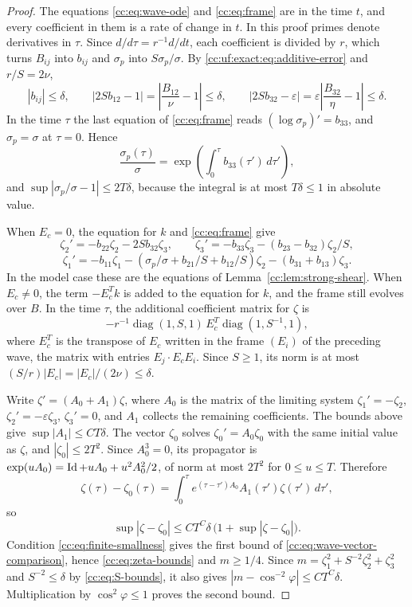 \begin{proof}
The equations \eqref{cc:eq:wave-ode} and \eqref{cc:eq:frame} are in the
time $t$, and every coefficient in them is a rate of change in $t$.
In this proof primes denote derivatives in $\tau$. Since
$d/d\tau=r^{-1}d/dt$, each coefficient is divided by $r$,
which turns $B_{ij}$ into $b_{ij}$ and $\sigma_p$ into
$S\sigma_p/\sigma$. By \eqref{cc:uf:exact:eq:additive-error} and
$r/S=2\nu$,
\[
 |b_{ij}|\le\delta,\qquad
 |2Sb_{12}-1|=\left|\frac{B_{12}}{\nu}-1\right|\le\delta,\qquad
 |2Sb_{32}-\varepsilon|
 =\varepsilon\left|\frac{B_{32}}{\eta}-1\right|\le\delta .
\]
In the time $\tau$ the last equation of \eqref{cc:eq:frame} reads
$(\log\sigma_p)'=b_{33}$, and $\sigma_p=\sigma$ at $\tau=0$. Hence
\[
 \frac{\sigma_p(\tau)}{\sigma}
 =\exp\left(\int_0^\tau b_{33}(\tau')\,d\tau'\right),
\]
and $\sup|\sigma_p/\sigma-1|\le2T\delta$, because the integral is at
most $T\delta\le1$ in absolute value.

When $E_c=0$, the equation for $k$ and
\eqref{cc:eq:frame} give
\[
 \zeta_2'=-b_{22}\zeta_2-2Sb_{32}\zeta_3,\qquad
 \zeta_3'=-b_{33}\zeta_3-(b_{23}-b_{32})\zeta_2/S,
\]
\[
 \zeta_1'=-b_{11}\zeta_1
  -(\sigma_p/\sigma+b_{21}/S+b_{12}/S)\zeta_2
  -(b_{31}+b_{13})\zeta_3.
\]
In the model case these are the equations of
Lemma~\ref{cc:lem:strong-shear}. When $E_c\ne0$, the term $-E_c^Tk$ is added to the equation for $k$,
and the frame still evolves over $B$. In the time $\tau$, the
additional coefficient matrix for $\zeta$ is
\[
 -r^{-1}\operatorname{diag}(1,S,1)\,E_c^T
                      \operatorname{diag}(1,S^{-1},1),
\]
where $E_c^T$ is the transpose of $E_c$ written in the frame $(E_i)$
of the preceding wave, the matrix with entries $E_j\cdot E_cE_i$.
Since $S\ge1$, its norm is at
most $(S/r)|E_c|=|E_c|/(2\nu)\le\delta$.

Write $\zeta'=(A_0+A_1)\zeta$, where $A_0$ is the matrix of the
limiting system $\zeta_1'=-\zeta_2$, $\zeta_2'=-\varepsilon\zeta_3$,
$\zeta_3'=0$, and $A_1$ collects the remaining coefficients. The bounds
above give $\sup|A_1|\le CT\delta$. The vector $\zeta_0$ solves
$\zeta_0'=A_0\zeta_0$ with the same initial value as $\zeta$, and
$|\zeta_0|\le2T^2$. Since $A_0^3=0$, its propagator is
$\exp(uA_0)=\operatorname{Id}+uA_0+u^2A_0^2/2$, of norm at most $2T^2$ for
$0\le u\le T$. Therefore
\[
 \zeta(\tau)-\zeta_0(\tau)
 =\int_0^\tau e^{(\tau-\tau')A_0}A_1(\tau')\zeta(\tau')\,d\tau',
\]
so
\[
 \sup|\zeta-\zeta_0|
 \le CT^C\delta\,\bigl(1+\sup|\zeta-\zeta_0|\bigr).
\]
Condition \eqref{cc:eq:finite-smallness} gives the first bound of
\eqref{cc:eq:wave-vector-comparison}, hence \eqref{cc:eq:zeta-bounds}
and $m\ge1/4$. Since $m=\zeta_1^2+S^{-2}\zeta_2^2+\zeta_3^2$ and
$S^{-2}\le\delta$ by \eqref{cc:eq:S-bounds}, it also
gives $|m-\cos^{-2}\varphi|\le CT^C\delta$. Multiplication by
$\cos^2\varphi\le1$ proves the second bound.


\end{proof}
